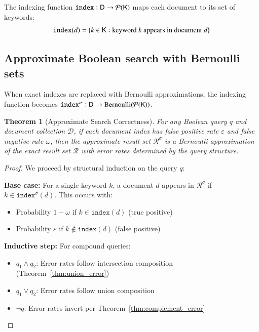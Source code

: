 \documentclass[10pt,final,hidelinks]{article}
\numberwithin{equation}{section}
\newcommand{\fprate}{\varepsilon}
\newcommand{\fnrate}{\omega}
\newcommand{\envnumstyle}{chapter}
\renewcommand{\envnumstyle}{chapter}
\renewcommand{\envnumstyle}{section}
\theoremstyle{plain}
\newtheorem{theorem}{Theorem}[\envnumstyle]
\begin{document}
The indexing function $\texttt{index}: \Set{D} \to \mathcal{P}(\Set{K})$ maps each document to its set of keywords:
\begin{equation}
\texttt{index}(d) = \{k \in \Set{K} : \text{keyword } k \text{ appears in document } d\}
\end{equation}

\subsection{Approximate Boolean search with Bernoulli sets}

When exact indexes are replaced with Bernoulli approximations, the indexing function becomes $\texttt{index}^\sigma: \Set{D} \to \text{Bernoulli}(\mathcal{P}(\Set{K}))$.

\begin{theorem}[Approximate Search Correctness]
\label{thm:approx_search}
For any Boolean query $q$ and document collection $\mathcal{D}$, if each document index has false positive rate $\fprate$ and false negative rate $\fnrate$, then the approximate result set $\mathcal{R}^\sigma$ is a Bernoulli approximation of the exact result set $\mathcal{R}$ with error rates determined by the query structure.
\end{theorem}

\begin{proof}
We proceed by structural induction on the query $q$:

\textbf{Base case:} For a single keyword $k$, a document $d$ appears in $\mathcal{R}^\sigma$ if $k \in \texttt{index}^\sigma(d)$. This occurs with:
\begin{itemize}
\item Probability $1-\fnrate$ if $k \in \texttt{index}(d)$ (true positive)
\item Probability $\fprate$ if $k \notin \texttt{index}(d)$ (false positive)
\end{itemize}

\textbf{Inductive step:} For compound queries:
\begin{itemize}
\item $q_1 \land q_2$: Error rates follow intersection composition (Theorem~\ref{thm:union_error})
\item $q_1 \lor q_2$: Error rates follow union composition
\item $\neg q$: Error rates invert per Theorem~\ref{thm:complement_error}
\end{itemize}
\end{proof}
\end{document}
